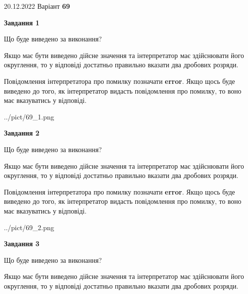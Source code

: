 \documentclass[12pt, ukrainian]{article}
\begin{document}
{20.12.2022 Варіант \No \textbf { 69 }\par}
{
\begin {Large}

{\begin {center}\textbf{Завдання 1}\end {center}}\par
Що буде виведено за виконання? \par

Якщо має бути виведено дійсне значення та інтерпретатор має здійснювати його округлення, 
то у відповіді достатньо правильно вказати два дробових розряди.

Повідомлення інтерпретатора про помилку позначати \textbf{error}.
Якщо щось буде виведено до того, як інтерпретатор видасть повідомлення про помилку, 
то воно має вказуватись у відповіді. \par

\begin{center}
	{../pict/69_1.png}
\end{center}
\newpage

{\begin {center}\textbf{Завдання 2}\end {center}}\par
Що буде виведено за виконання? \par

Якщо має бути виведено дійсне значення та інтерпретатор має здійснювати його округлення, 
то у відповіді достатньо правильно вказати два дробових розряди.

Повідомлення інтерпретатора про помилку позначати \textbf{error}.
Якщо щось буде виведено до того, як інтерпретатор видасть повідомлення про помилку, 
то воно має вказуватись у відповіді. \par

\begin{center}
	{../pict/69_2.png}
\end{center}
\newpage

{\begin {center}\textbf{Завдання 3}\end {center}}\par
Що буде виведено за виконання? \par

Якщо має бути виведено дійсне значення та інтерпретатор має здійснювати його округлення, 
то у відповіді достатньо правильно вказати два дробових розряди.


\end{Large}}
\end{document}
